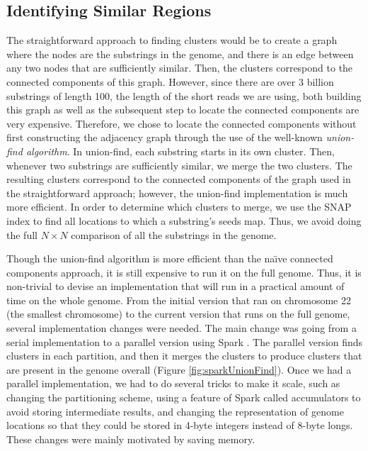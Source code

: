\documentclass[twocolumn,10pt]{article}
\begin{document}
\subsection{Identifying Similar Regions}
\label{section:identifyingSimilarRegions}

The straightforward approach to finding clusters would be to create a graph where the nodes are the substrings in the genome, and there is an edge between any two nodes that are sufficiently similar.  Then, the clusters correspond to the connected components of this graph.  However, since there are over 3 billion substrings of length 100, the length of the short reads we are using, both building this graph as well as the subsequent step to locate the connected components are very expensive.  Therefore, we chose to locate the connected components without first constructing the adjacency graph through the use of the well-known \textit{union-find algorithm}.  In union-find, each substring starts in its own cluster.  Then, whenever two substrings are sufficiently similar, we merge the two clusters.  The resulting clusters correspond to the connected components of the graph used in the straightforward approach; however, the union-find implementation is much more efficient.  In order to determine which clusters to merge, we use the SNAP index to find all locations to which a substring's seeds map.  Thus, we avoid doing the full \(N \times N\) comparison of all the substrings in the genome.

Though the union-find algorithm is more efficient than the na\"{\i}ve connected components approach, it is still expensive to run it on the full genome.  Thus, it is non-trivial to devise an implementation that will run in a practical amount of time on the whole genome.  From the initial version that ran on chromosome 22 (the smallest chromosome) to the current version that runs on the full genome, several implementation changes were needed.  The main change was going from a serial implementation to a parallel version using Spark \cite{Zaharia:2012}.  The parallel version finds clusters in each partition, and then it merges the clusters to produce clusters that are present in the genome overall (Figure \ref{fig:sparkUnionFind}).  Once we had a parallel implementation, we had to do several tricks to make it scale, such as changing the partitioning scheme, using a feature of Spark called accumulators to avoid storing intermediate results, and changing the representation of genome locations so that they could be stored in 4-byte integers instead of 8-byte longs.  These changes were mainly motivated by saving memory.
\end{document}
